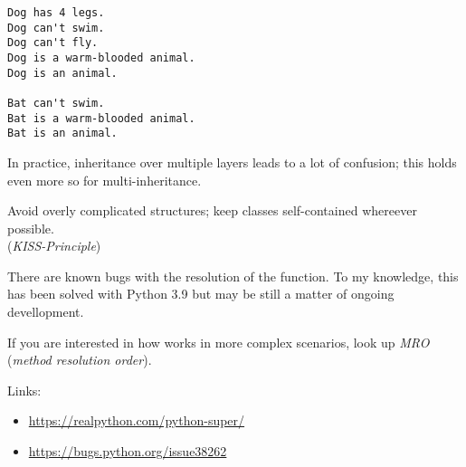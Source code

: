 \begin{frame}[fragile]
%
\begin{tcbraster}[raster columns=2,
                  raster equal height,
                  nobeforeafter,
                  raster column skip=0.5cm]
\begin{cmdbox}
\begin{verbatim}
Dog has 4 legs.
Dog can't swim.
Dog can't fly.
Dog is a warm-blooded animal.
Dog is an animal.

Bat can't swim.
Bat is a warm-blooded animal.
Bat is an animal.
\end{verbatim}
\end{cmdbox}
%
\begin{hintbox}
In practice, inheritance over multiple layers leads to a lot of confusion; this holds even more so for multi-inheritance.

\vspace{3pt}
Avoid overly complicated structures; keep classes self-contained whereever possible.\\
(\Thus \emph{KISS-Principle})
\end{hintbox}
\end{tcbraster}
%
\end{frame}


\begin{frame}[fragile]
%
\begin{warnbox}
\small
There are known bugs with the resolution of the  function. To my knowledge, this has been solved with Python 3.9 but may be still a matter of ongoing devellopment.

\vspace{6pt}
If you are interested in how  works in more complex scenarios, look up \emph{MRO} (\emph{method resolution order}).

\vspace{6pt}
Links:
\begin{itemize}
\item \url{https://realpython.com/python-super/}
\item \url{https://bugs.python.org/issue38262}
\end{itemize}
\end{warnbox}
%
\end{frame}